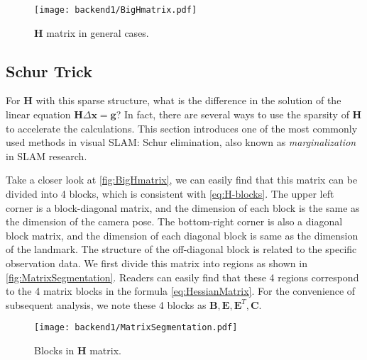 \begin{figure}[!ht]
	\centering
	\texttt{[image: backend1/BigHmatrix.pdf]}
	\caption{$\mathbf{H}$ matrix in general cases.}
	\label{fig:BigHmatrix}
\end{figure}

\subsection{Schur Trick}
For $\mathbf{H}$ with this sparse structure, what is the difference in the solution of the linear equation $\mathbf{H} \Delta \mathbf{x}= \mathbf{g}$? In fact, there are several ways to use the sparsity of $\mathbf{H}$ to accelerate the calculations. This section introduces one of the most commonly used methods in visual SLAM: Schur elimination, also known as \textit{marginalization} in SLAM research.

Take a closer look at \autoref{fig:BigHmatrix}, we can easily find that this matrix can be divided into 4 blocks, which is consistent with \eqref{eq:H-blocks}. The upper left corner is a block-diagonal matrix, and the dimension of each block is the same as the dimension of the camera pose. The bottom-right corner is also a diagonal block matrix, and the dimension of each diagonal block is same as the dimension of the landmark. The structure of the off-diagonal block is related to the specific observation data. We first divide this matrix into regions as shown in \autoref{fig:MatrixSegmentation}. Readers can easily find that these 4 regions correspond to the 4 matrix blocks in the formula \eqref{eq:HessianMatrix}. For the convenience of subsequent analysis, we note these 4 blocks as $\mathbf{B}, \mathbf{E}, \mathbf{E}^T, \mathbf{C}$.

\begin{figure}[!ht]
	\centering
	\texttt{[image: backend1/MatrixSegmentation.pdf]}
	\caption{Blocks in $\mathbf{H}$ matrix.}
	\label{fig:MatrixSegmentation}
\end{figure}

